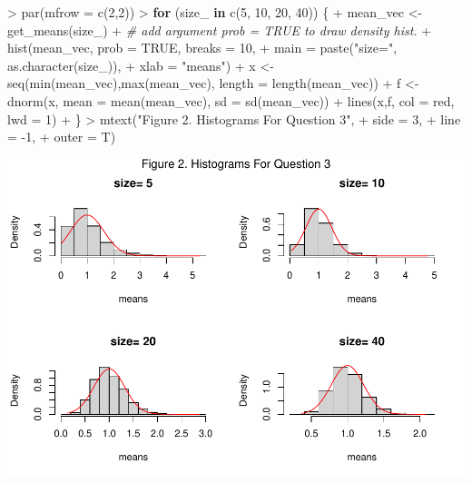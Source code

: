 \documentclass[
]{article}
\newenvironment{Shaded}{\begin{snugshade}}{\end{snugshade}}
\newcommand{\AttributeTok}[1]{\textcolor[rgb]{0.77,0.63,0.00}{#1}}
\newcommand{\CommentTok}[1]{\textcolor[rgb]{0.56,0.35,0.01}{\textit{#1}}}
\newcommand{\ConstantTok}[1]{\textcolor[rgb]{0.00,0.00,0.00}{#1}}
\newcommand{\ControlFlowTok}[1]{\textcolor[rgb]{0.13,0.29,0.53}{\textbf{#1}}}
\newcommand{\DecValTok}[1]{\textcolor[rgb]{0.00,0.00,0.81}{#1}}
\newcommand{\FunctionTok}[1]{\textcolor[rgb]{0.00,0.00,0.00}{#1}}
\newcommand{\NormalTok}[1]{#1}
\newcommand{\OtherTok}[1]{\textcolor[rgb]{0.56,0.35,0.01}{#1}}
\newcommand{\SpecialCharTok}[1]{\textcolor[rgb]{0.00,0.00,0.00}{#1}}
\newcommand{\StringTok}[1]{\textcolor[rgb]{0.31,0.60,0.02}{#1}}
\begin{document}
\begin{Shaded}
\begin{Highlighting}[]
\SpecialCharTok{\textgreater{}} \FunctionTok{par}\NormalTok{(}\AttributeTok{mfrow =} \FunctionTok{c}\NormalTok{(}\DecValTok{2}\NormalTok{,}\DecValTok{2}\NormalTok{))}
\SpecialCharTok{\textgreater{}} \ControlFlowTok{for}\NormalTok{ (size\_ }\ControlFlowTok{in} \FunctionTok{c}\NormalTok{(}\DecValTok{5}\NormalTok{, }\DecValTok{10}\NormalTok{, }\DecValTok{20}\NormalTok{, }\DecValTok{40}\NormalTok{)) \{}
\SpecialCharTok{+}\NormalTok{   mean\_vec }\OtherTok{\textless{}{-}} \FunctionTok{get\_means}\NormalTok{(size\_)}
\SpecialCharTok{+}   \CommentTok{\# add argument prob = TRUE to draw density hist.}
\SpecialCharTok{+}   \FunctionTok{hist}\NormalTok{(mean\_vec, }\AttributeTok{prob =} \ConstantTok{TRUE}\NormalTok{, }\AttributeTok{breaks =} \DecValTok{10}\NormalTok{,}
\SpecialCharTok{+}        \AttributeTok{main =} \FunctionTok{paste}\NormalTok{(}\StringTok{"size="}\NormalTok{, }\FunctionTok{as.character}\NormalTok{(size\_)),}
\SpecialCharTok{+}        \AttributeTok{xlab =} \StringTok{"means"}\NormalTok{)}
\SpecialCharTok{+}\NormalTok{   x }\OtherTok{\textless{}{-}} \FunctionTok{seq}\NormalTok{(}\FunctionTok{min}\NormalTok{(mean\_vec),}\FunctionTok{max}\NormalTok{(mean\_vec), }\AttributeTok{length =} \FunctionTok{length}\NormalTok{(mean\_vec))}
\SpecialCharTok{+}\NormalTok{   f }\OtherTok{\textless{}{-}} \FunctionTok{dnorm}\NormalTok{(x, }\AttributeTok{mean =} \FunctionTok{mean}\NormalTok{(mean\_vec), }\AttributeTok{sd =} \FunctionTok{sd}\NormalTok{(mean\_vec))}
\SpecialCharTok{+}   \FunctionTok{lines}\NormalTok{(x,f, }\AttributeTok{col =} \StringTok{\textquotesingle{}red\textquotesingle{}}\NormalTok{, }\AttributeTok{lwd =} \DecValTok{1}\NormalTok{)}
\SpecialCharTok{+}\NormalTok{ \}}
\SpecialCharTok{\textgreater{}} \FunctionTok{mtext}\NormalTok{(}\StringTok{"Figure 2. Histograms For Question 3"}\NormalTok{,}
\SpecialCharTok{+}       \AttributeTok{side =} \DecValTok{3}\NormalTok{,}
\SpecialCharTok{+}       \AttributeTok{line =} \SpecialCharTok{{-}}\DecValTok{1}\NormalTok{,}
\SpecialCharTok{+}       \AttributeTok{outer =}\NormalTok{ T)}
\end{Highlighting}
\end{Shaded}

\includegraphics[width=1\linewidth,height=0.5\textheight]{homework_01_solutions_files/figure-latex/unnamed-chunk-4-1}
\end{document}

